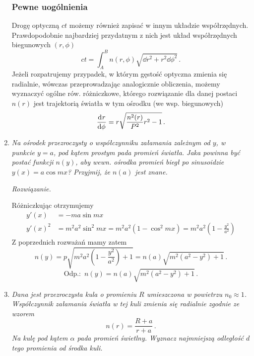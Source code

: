 \documentclass[../main.tex]{subfiles}
\begin{document}
\begin{enumerate}
\subsubsection*{Pewne uogólnienia}
Drogę optyczną \(ct\) możemy również zapisać w innym układzie współrzędnych. Prawdopodobnie najbardziej przydatnym z nich jest układ współrzędnych biegunowych \((r,\phi)\)
\begin{equation*}
    ct=\int_{A}^{B}n(r,\phi)\sqrt{\dd{r}^2+r^2\dd{\phi}^2}\,.
\end{equation*}
Jeżeli rozpatrujemy przypadek, w którym gęstość optyczna zmienia się radialnie, wówczas przeprowadzając analogicznie obliczenia, możemy wyznaczyć ogólne rów. różniczkowe, którego rozwiązanie dla danej postaci \(n(r)\) jest trajektorią światła w tym ośrodku (we wsp. biegunowych)
\begin{equation*}
    \dv[]{r}{\phi}=r\sqrt{\frac{n^2(r)}{P^2}r^2-1}\,.
\end{equation*}

\item \textit{Na ośrodek przezroczysty o współczynniku załamania zależnym od \(y\), w punkcie \(y=a\), pod kątem prostym pada promień światła. Jaka powinna być postać funkcji \(n(y)\), aby wewn. ośrodka promień biegł po sinusoidzie \(y(x)=a\cos mx\)? Przyjmij, że \(n(a)\) jest znane.}
\medskip

\textit{Rozwiązanie.}
\medskip

Różniczkując otrzymujemy 
\begin{equation*}
\begin{split}
    y'(x)&=-ma\sin mx\\
    y'(x)^2&=m^2a^2\sin^2mx=m^2a^2(1-\cos^2 mx)=m^2a^2\left(1-\frac{y^2}{a^2}\right)
\end{split}
\end{equation*}
Z poprzednich rozważań mamy zatem
\begin{equation*}
    n(y)=p\sqrt{m^2a^2\left(1-\frac{y^2}{a^2}\right)+1}=n(a)\sqrt{m^2\left(a^2-y^2\right)+1}\,.
\end{equation*}
\begin{equation*}
    \text{Odp.: }\,n(y)=n(a)\sqrt{m^2\left(a^2-y^2\right)+1}\,.
\end{equation*}
\item
\noindent\textit{Dana jest przezroczysta kula o promieniu \(R\) umieszczona w powietrzu \(n_0\approx 1\). Współczynnik załamania światła w tej kuli zmienia się radialnie zgodnie ze wzorem
\begin{equation*}
    n(r)=\frac{R+a}{r+a}\,.
\end{equation*}
Na kulę pod kątem \(\alpha\) pada promień świetlny. Wyznacz najmniejszą odległość \(d\) tego promienia od środka kuli.}
\medskip


\end{enumerate}
\end{document}

